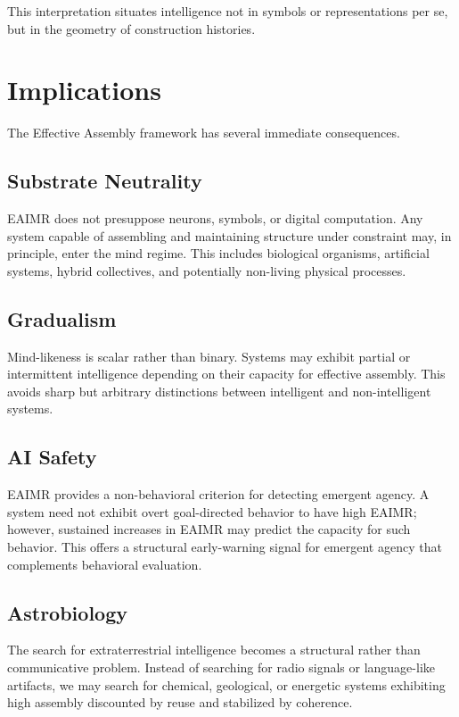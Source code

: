 \documentclass[11pt,letterpaper]{article}
\begin{document}
This interpretation situates intelligence not in symbols or representations per se, but in the geometry of construction histories.

\section{Implications}

The Effective Assembly framework has several immediate consequences.

\subsection{Substrate Neutrality}

EAIMR does not presuppose neurons, symbols, or digital computation. Any system capable of assembling and maintaining structure under constraint may, in principle, enter the mind regime. This includes biological organisms, artificial systems, hybrid collectives, and potentially non-living physical processes.

\subsection{Gradualism}

Mind-likeness is scalar rather than binary. Systems may exhibit partial or intermittent intelligence depending on their capacity for effective assembly. This avoids sharp but arbitrary distinctions between intelligent and non-intelligent systems.

\subsection{AI Safety}

EAIMR provides a non-behavioral criterion for detecting emergent agency. A system need not exhibit overt goal-directed behavior to have high EAIMR; however, sustained increases in EAIMR may predict the capacity for such behavior. This offers a structural early-warning signal for emergent agency that complements behavioral evaluation.

\subsection{Astrobiology}

The search for extraterrestrial intelligence becomes a structural rather than communicative problem. Instead of searching for radio signals or language-like artifacts, we may search for chemical, geological, or energetic systems exhibiting high assembly discounted by reuse and stabilized by coherence.
\end{document}
